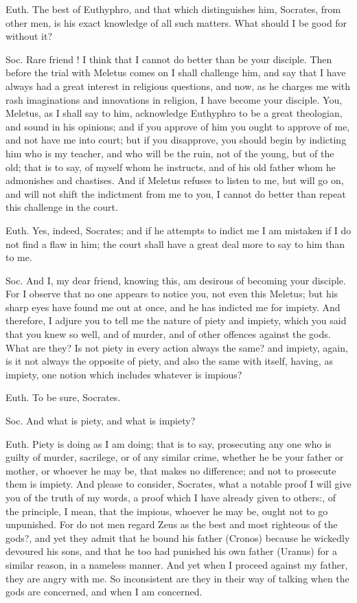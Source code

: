 Euth. The best of Euthyphro, and that which distinguishes him, Socrates, from other men, is his exact knowledge of all such matters. What should I be good for without it?

Soc. Rare friend ! I think that I cannot do better than be your disciple. Then before the trial with Meletus comes on I shall challenge him, and say that I have always had a great interest in religious questions, and now, as he charges me with rash imaginations and innovations in religion, I have become your disciple. You, Meletus, as I shall say to him, acknowledge Euthyphro to be a great theologian, and sound in his opinions; and if you approve of him you ought to approve of me, and not have me into court; but if you disapprove, you should begin by indicting him who is my teacher, and who will be the ruin, not of the young, but of the old; that is to say, of myself whom he instructs, and of his old father whom he admonishes and chastises. And if Meletus refuses to listen to me, but will go on, and will not shift the indictment from me to you, I cannot do better than repeat this challenge in the court.

Euth. Yes, indeed, Socrates; and if he attempts to indict me I am mistaken if I do not find a flaw in him; the court shall have a great deal more to say to him than to me.

Soc. And I, my dear friend, knowing this, am desirous of becoming your disciple. For I observe that no one appears to notice you,  not even this Meletus; but his sharp eyes have found me out at once, and he has indicted me for impiety. And therefore, I adjure you to tell me the nature of piety and impiety, which you said that you knew so well, and of murder, and of other offences against the gods. What are they? Is not piety in every action always the same? and impiety, again,  is it not always the opposite of piety, and also the same with itself, having, as impiety, one notion which includes whatever is impious?

Euth. To be sure, Socrates.

Soc. And what is piety, and what is impiety?

Euth. Piety is doing as I am doing; that is to say, prosecuting any one who is guilty of murder, sacrilege, or of any similar crime, whether he be your father or mother, or whoever he may be, that makes no difference; and not to prosecute them is impiety. And please to consider, Socrates, what a notable proof I will give you of the truth of my words, a proof which I have already given to others:, of the principle, I mean, that the impious, whoever he may be, ought not to go unpunished. For do not men regard Zeus as the best and most righteous of the gods?, and yet they admit that he bound his father (Cronos) because he wickedly devoured his sons, and that he too had punished his own father (Uranus) for a similar reason, in a nameless manner. And yet when I proceed against my father, they are angry with me. So inconsistent are they in their way of talking when the gods are concerned, and when I am concerned.

